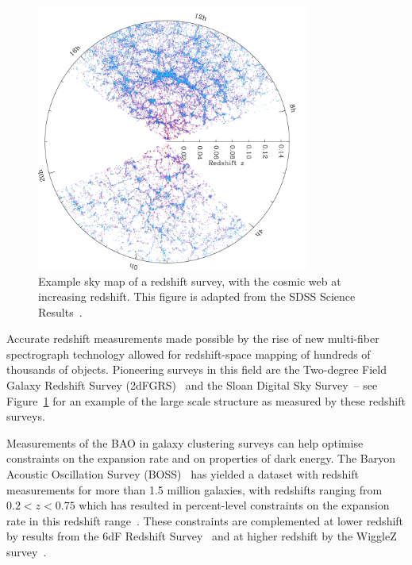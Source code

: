 \begin{figure}[!ht]
	\centering
	\includegraphics[width=0.8\textwidth]{fig/sdss.png}
	\caption{Example sky map of a redshift survey, with the cosmic web at increasing redshift. This figure is adapted from the SDSS Science Results~\cite{SDSS:2018ws}.}
	\label{fig:redshiftsurveypicture}
\end{figure}

Accurate redshift measurements made possible by the rise of new multi-fiber spectrograph technology allowed for redshift-space mapping of hundreds of thousands of objects. Pioneering surveys in this field are the Two-degree Field Galaxy Redshift Survey (2dFGRS)~\cite{2DFGRS:2001zay} and the Sloan Digital Sky Survey~\cite{SDSS:2000hjo}-- see Figure~\ref{fig:redshiftsurveypicture} for an example of the large scale structure as measured by these redshift surveys.

Measurements of the BAO in galaxy clustering surveys can help optimise constraints on the expansion rate and on properties of dark energy. The Baryon Acoustic Oscillation Survey (BOSS)~\cite{Dawson:2012} has yielded a dataset with redshift measurements for more than 1.5 million galaxies, with redshifts ranging from $0.2 < z < 0.75$ which has resulted in percent-level constraints on the expansion rate in this redshift range~\cite{BOSS:2016wmc}. These constraints are complemented at lower redshift by results from the 6dF Redshift Survey~\cite{Beutler:2011} and at higher redshift by the WiggleZ survey~\cite{Blake:2011a,Blake:2011b}. 

